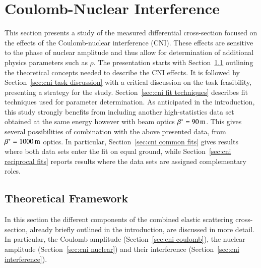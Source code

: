 \section{Coulomb-Nuclear Interference}
\label{sec:coulomb}

This section presents a study of the measured differential cross-section focused on the effects of the Coulomb-nuclear interference (CNI). These effects are sensitive to the phase of nuclear amplitude and thus allow for determination of additional physics parameters such as $\rho$. The presentation starts with Section~\ref{sec:cni framework} outlining the theoretical concepts needed to describe the CNI effects. It is followed by Section~\ref{sec:cni task discussion} with a critical discussion on the task feasibility, presenting a strategy for the study. Section~\ref{sec:cni fit techniques} describes fit techniques used for parameter determination. As anticipated in the introduction, this study strongly benefits from including another high-statistics data set \cite{8tev-90m} obtained at the same energy however with beam optics $\beta^* = 90\,{\rm m}$. This gives several possibilities of combination with the above presented data, from $\beta^* = 1000\,{\rm m}$ optics. In particular, Section~\ref{sec:cni common fits} gives results where both data sets enter the fit on equal ground, while Section~\ref{sec:cni reciprocal fits} reports results where the data sets are assigned complementary roles.





\subsection{Theoretical Framework}
\label{sec:cni framework}

In this section the different components of the combined elastic scattering cross-section, already briefly outlined in the introduction, are discussed in more detail. In particular, the Coulomb amplitude (Section~\ref{sec:cni coulomb}), the nuclear amplitude (Section~\ref{sec:cni nuclear}) and their interference (Section~\ref{sec:cni interference}).

